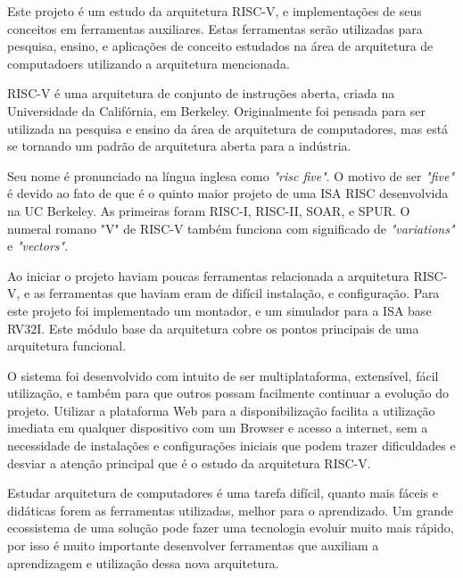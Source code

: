 

Este projeto é um estudo da arquitetura RISC-V, e implementações de seus conceitos em ferramentas auxiliares. Estas ferramentas serão utilizadas para pesquisa, ensino, e aplicações de conceito estudados na área de arquitetura de computadoers utilizando a arquitetura mencionada.

RISC-V é uma arquitetura de conjunto de instruções aberta, criada na Universidade da Califórnia, em Berkeley. Originalmente foi pensada para ser utilizada na pesquisa e ensino da área de arquitetura de computadores, mas está se tornando um padrão de arquitetura aberta para a indústria.~\cite{riscv_spec}

Seu nome é pronunciado na língua inglesa como \textit{"risc five"}. O motivo de ser \textit{"five"} é devido ao fato de que é o quinto maior projeto de uma ISA RISC desenvolvida na UC Berkeley. As primeiras foram RISC-I, RISC-II, SOAR, e SPUR. O numeral romano "V" de RISC-V também funciona com significado de \textit{"variations"} e \textit{"vectors"}.

Ao iniciar o projeto haviam poucas ferramentas relacionada a arquitetura RISC-V, e as ferramentas que haviam eram de difícil instalação, e configuração. Para este projeto foi implementado um montador, e um simulador para a ISA base RV32I. Este módulo base da arquitetura cobre os pontos principais de uma arquitetura funcional. 

O sistema foi desenvolvido com intuito de ser multiplataforma, extensível, fácil utilização, e também para que outros possam facilmente continuar a evolução do projeto. Utilizar a plataforma Web para a disponibilização facilita a utilização imediata em qualquer dispositivo com um Browser e acesso a internet, sem a necessidade de instalações e configurações iniciais que podem trazer dificuldades e desviar a atenção principal que é o estudo da arquitetura RISC-V. 

Estudar arquitetura de computadores é uma tarefa difícil, quanto mais fáceis e didáticas forem as ferramentas utilizadas, melhor para o aprendizado. Um grande ecossistema de uma solução pode fazer uma tecnologia evoluir muito mais rápido, por isso é muito importante desenvolver ferramentas que auxiliam a aprendizagem e utilização dessa nova arquitetura.


